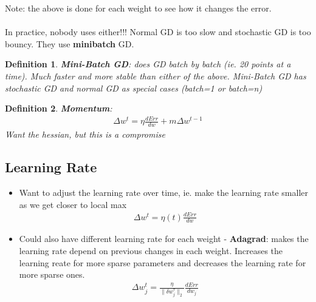 \documentclass[a4paper]{article}\usepackage[]{graphicx}\usepackage[]{color}
\newtheorem{defn}{Definition}[section]
\begin{document}
Note: the above is done for each weight to see how it changes the error. \\
\\
In practice, nobody uses either!!! Normal GD is too slow and stochastic GD is too bouncy. They use \textbf{minibatch} GD. 
\begin{defn}
\textbf{Mini-Batch GD}: does GD batch by batch (ie. 20 points at a time). Much faster and more stable than either of the above. Mini-Batch GD has stochastic GD and normal GD as special cases (batch=1 or batch=n)
\end{defn}

\begin{defn} \textbf{Momentum}:
\begin{align*}
\Delta w^t = \eta \frac{dErr}{dw} + m \Delta w^{t-1}
\end{align*}
Want the hessian, but this is a compromise
\end{defn}

\subsection{Learning Rate}

\begin{itemize}
\item Want to adjust the learning rate over time, ie. make the learning rate smaller as we get closer to local max
\begin{align*} \Delta w^t = \eta(t) \frac{dErr}{dw} \end{align*}
\item Could also have different learning rate for each weight - \textbf{Adagrad}: makes the learning rate depend on previous changes in each weight. Increases the learning reate for more sparse parameters and decreases the learning rate for more sparse ones. 
\begin{align*}
\Delta w_j^t = \frac{\eta}{\lVert \delta w_j^{\tau}\rVert_2}\frac{dErr}{dw_j}
\end{align*}

\end{itemize}
\end{document}
